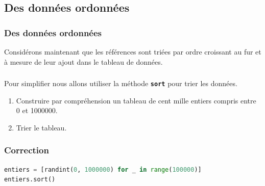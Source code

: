 \documentclass[svgnames,11pt]{beamer}
\begin{document}
\subsection{Des données ordonnées}
\begin{frame}
    \frametitle{Des données ordonnées}
    Considérons maintenant que les références sont triées par ordre croissant au fur et à mesure de leur ajout dans le tableau de données.
\begin{center}
\end{center}

\end{frame}
\begin{frame}
    \frametitle{}

    \begin{activite}
        Pour simplifier nous allons utiliser la méthode \textbf{\texttt{sort}} pour trier les données.
        \begin{enumerate}
            \item Construire par compréhension un tableau de cent mille entiers compris entre 0 et 1000000.
            \item Trier le tableau.
        \end{enumerate}
        \end{activite}

\end{frame}
\begin{frame}[fragile]
    \frametitle{Correction}

    \begin{center}
    \begin{lstlisting}[language=Python , basicstyle=\small, xleftmargin=2em, xrightmargin=2em]
entiers = [randint(0, 1000000) for _ in range(100000)]
entiers.sort()
\end{lstlisting}
    \label{CODE}
    \end{center}

\end{frame}
\end{document}
